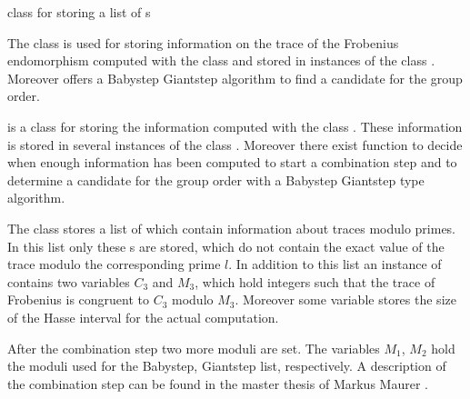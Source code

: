 

\NAME

 \dotfill class for storing a list of s



\ABSTRACT

The class  is used for storing information on the trace of the Frobenius
endomorphism computed with the class  and stored in instances of the class
.  Moreover  offers a Babystep Giantstep algorithm to find a
candidate for the group order.



\DESCRIPTION

 is a class for storing the information computed with the class
.  These information is stored in several instances of the class
.  Moreover there exist function to decide when enough information has been
computed to start a combination step and to determine a candidate for the group order with a
Babystep Giantstep type algorithm.

The class stores a list of  which contain information about traces modulo
primes.  In this list only these s are stored, which do not contain the exact
value of the trace modulo the corresponding prime $l$.  In addition to this list an instance of
 contains two variables $C_3$ and $M_3$, which hold integers such that the
trace of Frobenius is congruent to $C_3$ modulo $M_3$.  Moreover some variable stores the size
of the Hasse interval for the actual computation.

After the combination step two more moduli are set.  The variables $M_1$, $M_2$ hold the moduli
used for the Babystep, Giantstep list, respectively.  A description of the combination step can
be found in the master thesis of Markus Maurer \cite{Maurer_Thesis:1994}.



